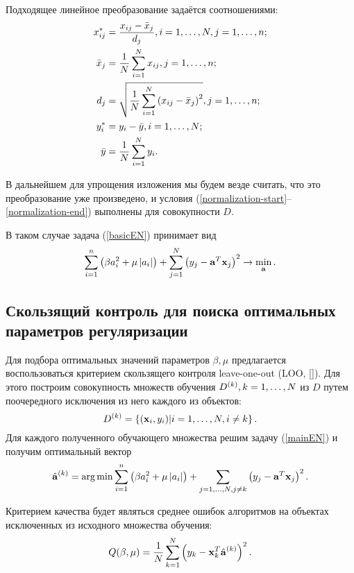 Подходящее линейное преобразование задаётся соотношениями:
\begin{align*}
	x^*_{ij} 	&= \frac{x_{ij} - \bar x_j}{d_j}, i=1, \ldots, N, j=1, \ldots, n;\\
	\bar x_j 	&= \frac1N\sum\limits_{i=1}^N x_{ij}, j=1, \ldots, n;\\
	d_j 		&= \sqrt{\frac1N\sum\limits_{i=1}^N \left(x_{ij}-\bar x_j\right)^2}, j=1, \ldots, n;\\
	y^*_i 		&= y_i - \bar y, i=1, \ldots, N;\\
	\bar y 		&= \frac1N\sum\limits_{i=1}^N y_i. \\
\end{align*}

В дальнейшем для упрощения изложения мы будем везде считать, что это преобразование уже произведено, и условия (\ref{normalization-start}--\ref{normalization-end}) выполнены для совокупности $D.$

В таком случае задача (\ref{basicEN}) принимает вид
\begin{equation}
	\label{mainEN}
	\sum_{i=1}^n\left(\beta a_i^2 + \mu \left|a_i\right|\right) 
	+ \sum_{j=1}^N\left(y_j - \boldsymbol{\mathbf{a}}^T \boldsymbol{\mathbf{x}}_j\right)^2 
	\to \mathop{\mbox{min}}\limits_{\boldsymbol{\mathbf{a}}}.
\end{equation}

\subsection{Скользящий контроль для поиска оптимальных параметров регуляризации} %
\label{sub:intro:LOO}
Для подбора оптимальных значений параметров $\beta, \mu$ предлагается воспользоваться критерием скользящего контроля leave-one-out (LOO, []).
Для этого построим совокупность множеств обучения $D^{(k)}, k=1, \ldots, N$ из $D$ путем поочередного исключения из него каждого из объектов: 
\begin{equation}
	D^{(k)}=\left\{(\boldsymbol{\mathbf{x}}_i, y_i) | i=1, \ldots, N, i\ne k\right\}.
\end{equation}
Для каждого полученного обучающего множества решим задачу (\ref{mainEN}) и получим оптимальный вектор 
\begin{equation*}
	\hat{\boldsymbol{\mathbf{a}}}^{(k)} 
	= \mathop{\mbox{arg\ \!min}}\limits \sum\limits_{i=1}^n\left(\beta a_i^2 + \mu \left|a_i\right|\right) 
	+ \sum\limits_{j=1, \ldots, N, j\ne k}\left(y_j - \boldsymbol{\mathbf{a}}^T \boldsymbol{\mathbf{x}}_j\right)^2.
\end{equation*}

Критерием качества будет являться среднее ошибок алгоритмов на объектах исключенных из исходного множества обучения:
\begin{equation}
	Q(\beta, \mu) = \frac1N\sum\limits_{k=1}^N \left(y_k - \boldsymbol{\mathbf{x}}_k^T\hat{\boldsymbol{\mathbf{a}}}^{(k)}\right)^2.
\end{equation}

